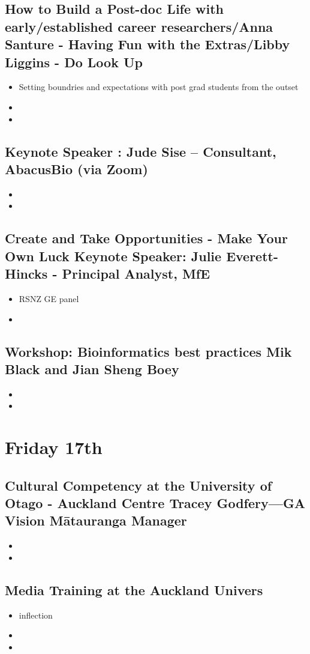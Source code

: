 \documentclass[document.tex]{subfiles}
\begin{document}
    \subsection{How to Build a Post-doc Life with early/established career researchers/Anna Santure - Having Fun with the Extras/Libby Liggins - Do Look Up}
    \begin{itemize}
    \item Setting boundries and expectations with post grad students from the outset
    \item 
    \item 
    \end{itemize}

    \subsection{Keynote Speaker : Jude Sise – Consultant, AbacusBio (via Zoom)}
    \begin{itemize}
    \item 
    \item 
    \end{itemize}

    \subsection{Create and Take Opportunities - Make Your Own Luck Keynote Speaker: Julie Everett-Hincks - Principal Analyst, MfE}
    \begin{itemize}
    \item RSNZ GE panel
    \item 
    \end{itemize}

    \subsection{Workshop: Bioinformatics best practices Mik Black and Jian Sheng Boey}
    \begin{itemize}
    \item 
    \item 
    \end{itemize}



\section*{Friday 17th}

    \subsection{Cultural Competency at the University of Otago - Auckland Centre Tracey Godfery—GA Vision Mātauranga Manager}
    \begin{itemize}
    \item 
    \item 
    \end{itemize}
    
    \subsection{Media Training at the Auckland Univers}
    \begin{itemize}
    \item inflection
    \item 
    \item 
    \end{itemize}
    
    
\bib{}
    
\end{document}
